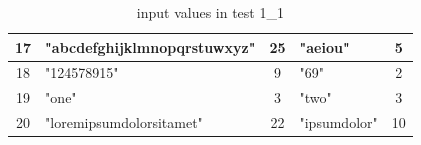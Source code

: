 \documentclass[11pt]{article}
\begin{document}
\begin{table}[H]
\begin{tabularx}{\textwidth}{|c|X|c|X|c|}
                            \hline
                            17 & "abcdefghijklmnopqrstuwxyz" & 25 & "aeiou" & 5 \\
                            \hline
                            18 & "124578915" & 9 & "69" & 2 \\
                            \hline
                            19 & "one" & 3 & "two" & 3 \\
                            \hline
                            20 & "loremipsumdolorsitamet" & 22 & "ipsumdolor" & 10 \\
                            \hline
                        \end{tabularx}
                    \caption{input values in test 1\_1}
                    \label{tab:test_1_1}
                \end{table}

                \newpage
\end{document}
